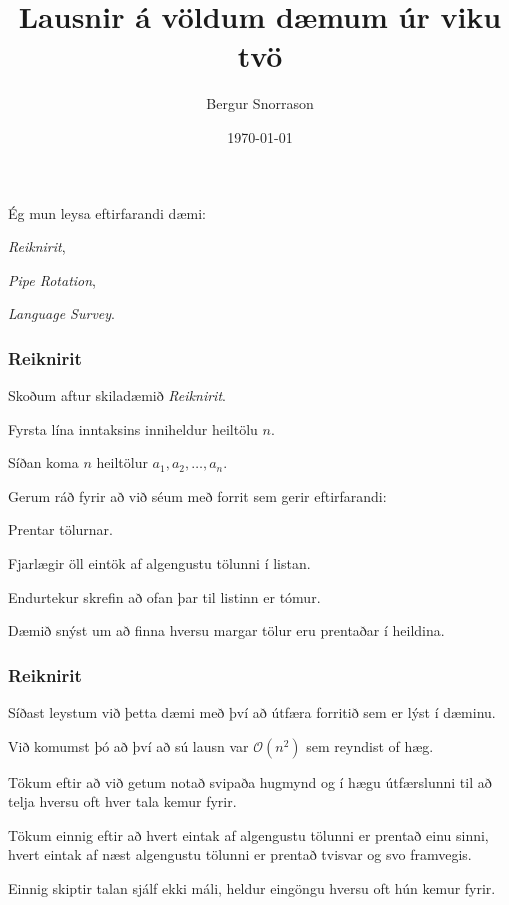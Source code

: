\title{Lausnir á völdum dæmum úr viku tvö}
\author{Bergur Snorrason}
\date{\today}



\frame{\titlepage}

{
	{
		\item<1-> Ég mun leysa eftirfarandi dæmi:
		{
			\item<2-> \emph{Reiknirit},
			\item<3-> \emph{Pipe Rotation},
			\item<4-> \emph{Language Survey}.
		}
	}
}

{
	\frametitle{Reiknirit}
	{
		\item<1-> Skoðum aftur skiladæmið \emph{Reiknirit}.
		\item<2-> Fyrsta lína inntaksins inniheldur heiltölu $n$.
		\item<3-> Síðan koma $n$ heiltölur $a_1, a_2, \dots, a_n$.
		\item<4-> Gerum ráð fyrir að við séum með forrit sem gerir eftirfarandi:
		{
			\item<5-> Prentar tölurnar.
			\item<6-> Fjarlægir öll eintök af algengustu tölunni í listan.
			\item<7-> Endurtekur skrefin að ofan þar til listinn er tómur.
		}
		\item<8-> Dæmið snýst um að finna hversu margar tölur eru prentaðar í heildina.
	}
}

{
	\frametitle{Reiknirit}
	{
		\item<1-> Síðast leystum við þetta dæmi með því að útfæra forritið sem er lýst í dæminu.
		\item<2-> Við komumst þó að því að sú lausn var $\mathcal{O}(n^2)$ sem reyndist of hæg.
		\item<3-> Tökum eftir að við getum notað svipaða hugmynd og í hægu útfærslunni til að telja hversu oft hver tala kemur fyrir.
		\item<4-> Tökum einnig eftir að hvert eintak af algengustu tölunni er prentað einu sinni,
					hvert eintak af næst algengustu tölunni er prentað tvisvar
					og svo framvegis.
		\item<5-> Einnig skiptir talan sjálf ekki máli, heldur eingöngu hversu oft hún kemur fyrir.
	}
}

